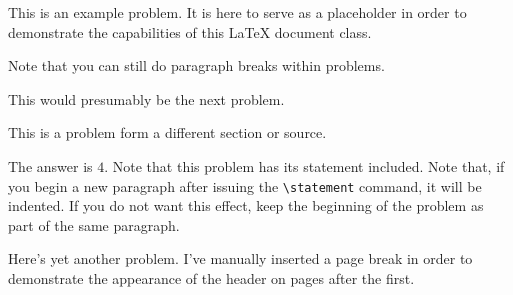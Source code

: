 \documentclass{homework}
\begin{document}
\maketitle


\begin{problem}{3}
  This is an example problem. It is here to serve as a placeholder in
  order to demonstrate the capabilities of this \LaTeX{} document
  class.

  Note that you can still do paragraph breaks within problems.
\end{problem}

\begin{problem}{4}
  This would presumably be the next problem.
\end{problem}


\begin{problem}{10}
  This is a problem form a different section or source.
\end{problem}

\begin{problem}{11}
  The answer is $4$. Note that this problem has its statement
  included. Note that, if you begin a new paragraph after issuing the
  \verb+\statement+ command, it will be indented. If you do not want
  this effect, keep the beginning of the problem as part of the same
  paragraph.
\end{problem}

\newpage

\begin{problem}{17}
  Here's yet another problem. I've manually inserted a page break in
  order to demonstrate the appearance of the header on pages after the
  first.
\end{problem}
\end{document}
